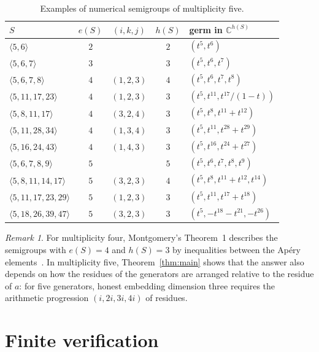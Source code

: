 \documentclass{amsart}
\theoremstyle{definition}
\theoremstyle{remark}
\newtheorem{remark}[theorem]{Remark}
\numberwithin{equation}{section}
\newcommand{\C}{\mathbb{C}}
\newcommand{\gen}[1]{\langle #1\rangle}
\begin{document}
\begin{table}[ht]
\caption{Examples of numerical semigroups of multiplicity five.}\label{tab:examples}
\begin{tabular}{lcccl}
\toprule
$S$ & $e(S)$ & $(i,k,j)$ & $h(S)$ & germ in $\C^{h(S)}$\\
\midrule
$\gen{5,6}$ & $2$ & & $2$ & $(t^5,t^6)$\\
$\gen{5,6,7}$ & $3$ & & $3$ & $(t^5,t^6,t^7)$\\
$\gen{5,6,7,8}$ & $4$ & $(1,2,3)$ & $4$ & $(t^5,t^6,t^7,t^8)$\\
$\gen{5,11,17,23}$ & $4$ & $(1,2,3)$ & $3$ & $(t^5,t^{11},t^{17}/(1-t))$\\
$\gen{5,8,11,17}$ & $4$ & $(3,2,4)$ & $3$ & $(t^5,t^{8},t^{11}+t^{12})$\\
$\gen{5,11,28,34}$ & $4$ & $(1,3,4)$ & $3$ & $(t^5,t^{11},t^{28}+t^{29})$\\
$\gen{5,16,24,43}$ & $4$ & $(1,4,3)$ & $3$ & $(t^5,t^{16},t^{24}+t^{27})$\\
$\gen{5,6,7,8,9}$ & $5$ & & $5$ & $(t^5,t^6,t^7,t^8,t^9)$\\
$\gen{5,8,11,14,17}$ & $5$ & $(3,2,3)$ & $4$ & $(t^5,t^8,t^{11}+t^{12},t^{14})$\\
$\gen{5,11,17,23,29}$ & $5$ & $(1,2,3)$ & $3$ & $(t^5,t^{11},t^{17}+t^{18})$\\
$\gen{5,18,26,39,47}$ & $5$ & $(3,2,3)$ & $3$ & $(t^5,-t^{18}-t^{21},-t^{26})$\\
\bottomrule
\end{tabular}
\end{table}

\begin{remark}
For multiplicity four, Montgomery's Theorem~1 describes the semigroups with $e(S)=4$ and $h(S)=3$ by inequalities between the Ap\'ery elements~\cite{Mon}. In multiplicity five, Theorem~\ref{thm:main} shows that the answer also depends on how the residues of the generators are arranged relative to the residue of $a$: for five generators, honest embedding dimension three requires the arithmetic progression $(i,2i,3i,4i)$ of residues.
\end{remark}

\section{Finite verification}\label{sec:computation}
\end{document}
